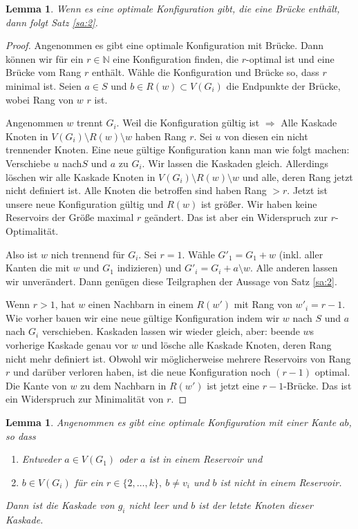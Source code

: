 \documentclass[12pt,a4paper]{scrartcl}
\numberwithin{equation}{section} %
\theoremstyle{definition}
\theoremstyle{plain}
\newtheorem{lem}[auf]{Lemma}
\newcommand{\nn}{\mathbb{N}}
\begin{document}
\begin{lem}
Wenn es eine optimale Konfiguration gibt, die eine Brücke enthält, dann folgt Satz \ref{sa:2}.
\label{lem:3}
\end{lem}
\begin{proof}
Angenommen es gibt eine optimale Konfiguration mit Brücke. Dann können wir für ein $r\in\nn$ eine Konfiguration finden, die $r$-optimal ist und eine Brücke vom Rang $r$ enthält. Wähle die Konfiguration und Brücke so, dass $r$ minimal ist. Seien $a\in S$ und $b\in R(w)\subset V(G_i)$ die Endpunkte der Brücke, wobei Rang von $w$ $r$ ist.\par
Angenommen $w$ trennt $G_i$. Weil die Konfiguration gültig ist $\Rightarrow$ Alle Kaskade Knoten in $V(G_i)\setminus R(w)\setminus w$ haben Rang $r$. Sei $u$ von diesen ein nicht trennender Knoten. Eine neue gültige Konfiguration kann man wie folgt machen: Verschiebe $u$ nach$S$ und $a$ zu $G_i$. Wir lassen die Kaskaden gleich. Allerdings löschen wir alle Kaskade Knoten in $V(G_i)\setminus R(w)\setminus w$  und alle, deren Rang jetzt nicht definiert ist. Alle Knoten die betroffen sind haben Rang $>r$. Jetzt ist unsere neue Konfiguration gültig und $R(w)$ ist größer. Wir haben keine Reservoirs der Größe maximal $r$ geändert. Das ist aber ein Widerspruch zur $r$-Optimalität.\par 
Also ist $w$ nich trennend für $G_i$. Sei $r=1$. Wähle $G'_1=G_1+w$ (inkl. aller Kanten die mit $w$ und $G_1$ indizieren) und $G'_i=G_i+a\setminus w$. Alle anderen lassen wir unverändert. Dann genügen diese Teilgraphen der Aussage von Satz \ref{sa:2}. \par 
Wenn $r>1$, hat $w$ einen Nachbarn in einem $R(w')$ mit Rang von $w'_i=r-1$. Wie vorher bauen wir eine neue gültige Konfiguration indem wir $w$ nach $S$ und $a$ nach $G_i$ verschieben. Kaskaden lassen wir wieder gleich, aber: beende $w$s vorherige Kaskade genau vor $w$ und lösche alle Kaskade Knoten, deren Rang nicht mehr definiert ist. Obwohl wir möglicherweise mehrere Reservoirs von Rang $r$ und darüber verloren haben, ist die neue Konfiguration noch $(r-1)$ optimal. Die Kante von $w$ zu dem Nachbarn in $R(w')$ ist jetzt eine $r-1$-Brücke. Das ist ein Widerspruch zur Minimalität von $r$.
\end{proof}
\begin{lem}
\label{lem:4}
Angenommen es gibt eine optimale Konfiguration mit einer Kante $ab$, so dass 
\begin{enumerate}
\item Entweder $a\in V(G_1)$ oder $a$ ist in einem Reservoir und
\item $b\in V(G_i)$ für ein $r\in\lbrace 2,\dotsc,k\rbrace,~b\neq v_i$ und $b$ ist nicht in einem Reservoir.
\end{enumerate}
Dann ist die Kaskade von $g_i$ nicht leer und $b$ ist der letzte Knoten dieser Kaskade.
\end{lem}
\end{document}
